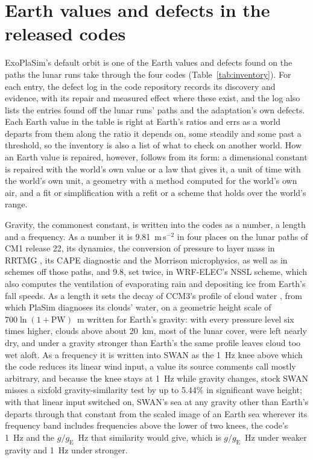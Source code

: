 \section{Earth values and defects in the released codes}

ExoPlaSim's default orbit is one of the Earth values and defects found on the paths the lunar runs take through
the four codes (Table~\ref{tab:inventory}). For each entry, the defect log in the code repository records its
discovery and evidence, with its repair and measured effect where these exist, and the log also lists the entries found off the lunar runs' paths and the adaptation's own defects. Each Earth value in the table is right at Earth's
ratios and errs as a world departs from them along the ratio it depends on, some steadily and some past a
threshold, so the inventory is also a list of what to check on another world. How an Earth value is repaired, however, follows from its form: a dimensional constant is repaired with the world's own value or a law that gives it, a unit of time with the world's own unit, a geometry with a method computed for the world's own air, and a fit or simplification with a refit or a scheme that holds over the world's range.

Gravity, the commonest constant, is written into the codes as a number, a length and a frequency. As a number it is
9.81~m\,s$^{-2}$ in four places on the lunar paths of CM1 release 22, its dynamics, the conversion of pressure to
layer mass in RRTMG \autocite{iacono2008radiative}, its CAPE diagnostic and the Morrison microphysics, as well as
in schemes off those paths, and 9.8, set twice, in WRF-ELEC's NSSL scheme, which also computes the ventilation of evaporating rain and depositing ice from Earth's fall speeds. As a length it
sets the decay of CCM3's profile of cloud water \autocite{kiehl1996description}, from which PlaSim diagnoses its
clouds' water, on a geometric height scale of $700\ln(1+\mathrm{PW})$~m written for Earth's gravity: with every
pressure level six times higher, clouds above about 20~km, most of the lunar cover, were left nearly dry, and under
a gravity stronger than Earth's the same profile leaves cloud too wet aloft. As a frequency
it is written into SWAN as the 1~Hz knee above which the code reduces its linear wind input, a value its source
comments call mostly arbitrary, and because the knee stays at 1~Hz while gravity changes, stock SWAN misses a
sixfold gravity-similarity test by up to 5.44\% in significant wave height; with that linear input switched on, SWAN's
sea at any gravity other than Earth's departs through that constant from the
scaled image of an Earth sea wherever its frequency band includes frequencies above the lower of two knees, the code's 1~Hz and
the $g/g_\mathrm{E}$~Hz that similarity would give, which is $g/g_\mathrm{E}$~Hz under weaker gravity and 1~Hz
under stronger.

